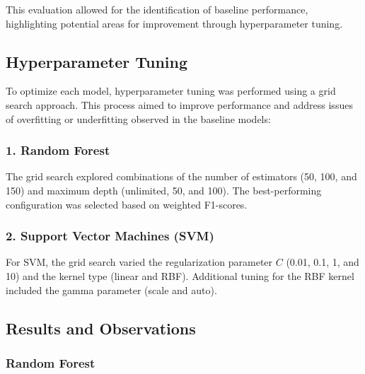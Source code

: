         This evaluation allowed for the identification of baseline performance, highlighting potential areas for improvement through hyperparameter tuning.

    \subsection{Hyperparameter Tuning}
    
        To optimize each model, hyperparameter tuning was performed using a grid search approach. This process aimed to improve performance and address issues of overfitting or underfitting observed in the baseline models:

        \subsubsection*{1. Random Forest \\}
        
            The grid search explored combinations of the number of estimators (50, 100, and 150) and maximum depth (unlimited, 50, and 100). The best-performing configuration was selected based on weighted F1-scores.

        \subsubsection*{2. Support Vector Machines (SVM) \\}
        
            For SVM, the grid search varied the regularization parameter \( C \) (0.01, 0.1, 1, and 10) and the kernel type (linear and RBF). Additional tuning for the RBF kernel included the gamma parameter (scale and auto).

    \subsection{Results and Observations}

        \subsubsection{Random Forest}
            
